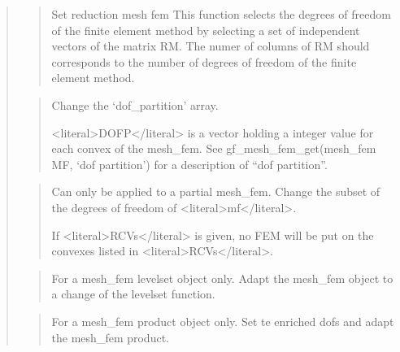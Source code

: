 \documentclass[a4paper,11pt,english]{sphinxmanual}
\begin{document}
\begin{quote}
\begin{quote}
\sphinxAtStartPar
Set reduction mesh fem
This function selects the degrees of freedom of the finite element
method by selecting a set of independent vectors of the matrix RM.
The numer of columns of RM should corresponds to the number of degrees
of freedom of the finite element method.
\end{quote}

\sphinxAtStartPar
{}
\begin{quote}

\sphinxAtStartPar
Change the ‘dof\_partition’ array.

\sphinxAtStartPar
\textless{}literal\textgreater{}DOFP\textless{}/literal\textgreater{} is a vector holding a integer value for each convex of the mesh\_fem.
See gf\_mesh\_fem\_get(mesh\_fem MF, ‘dof partition’) for a description of “dof partition”.
\end{quote}

\sphinxAtStartPar
{}
\begin{quote}

\sphinxAtStartPar
Can only be applied to a partial mesh\_fem. Change the subset of the
degrees of freedom of \textless{}literal\textgreater{}mf\textless{}/literal\textgreater{}.

\sphinxAtStartPar
If \textless{}literal\textgreater{}RCVs\textless{}/literal\textgreater{} is given, no FEM will be put on the convexes listed
in \textless{}literal\textgreater{}RCVs\textless{}/literal\textgreater{}.
\end{quote}

\sphinxAtStartPar
{}
\begin{quote}

\sphinxAtStartPar
For a mesh\_fem levelset object only. Adapt the mesh\_fem object to a
change of the levelset function.
\end{quote}

\sphinxAtStartPar
{}
\begin{quote}

\sphinxAtStartPar
For a mesh\_fem product object only. Set te enriched dofs and adapt the mesh\_fem product.
\end{quote}
\end{quote}
\end{document}
